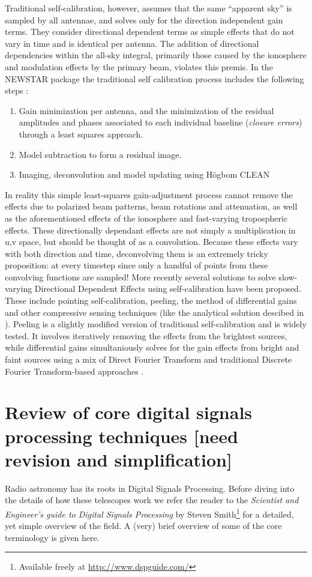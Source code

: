 \documentclass[a4paper,10pt]{report}
\begin{document}
 Traditional self-calibration, however, assumes that the same ``apparent sky'' is sampled by all antennae, and solves only for the direction independent gain terms. They consider directional dependent terms as simple effects that 
 do not vary in time and is identical per antenna. The addition of directional dependencies within the all-sky integral, primarily those caused by the ionosphere and modulation effects by the primary beam, violates this premis. In 
 the NEWSTAR package the traditional self calibration process includes the following steps \cite{2011A&A...527A.107S}:
 \begin{enumerate}
  \item Gain minimization per antenna, and the minimization of the residual amplitudes and phases associated to each individual baseline (\textit{closure errors}) through a least squares approach.
  \item Model subtraction to form a residual image.
  \item Imaging, deconvolution and model updating using H\"ogbom CLEAN
 \end{enumerate}
 
 In reality this simple least-squares gain-adjustment process cannot remove the effects due to polarized beam patterns, beam rotations and attenuation, as well as the aforementioned effects of the ionosphere and fast-varying tropospheric
 effects. These directionally dependant effects are not simply a multiplication in u,v space, but should be thought of as a convolution. Because these effects vary with both direction and time, deconvolving them is an extremely tricky proposition: 
 at every timestep since only a handful of points from these convolving functions are sampled! More recently several solutions to solve slow-varying Directional Dependent Effects using self-calibration have been proposed. These include pointing self-calibration,
 peeling, the method of differential gains and other compressive sensing techniques (like the analytical solution descibed in \cite{hardy2013direct}). Peeling is a slightly modified version of traditional self-calibration and is widely tested. It involves iteratively removing the effects from the brightest sources, while 
 differential gains simultaniously solves for the gain effects from bright and faint sources using a mix of Direct Fourier Transform and traditional Discrete Fourier Transform-based approaches \cite{2011A&A...527A.107S,2011A&A...527A.108S}.
 \section{Review of core digital signals processing techniques [need revision and simplification]}
Radio astronomy has its roots in Digital Signals Processing. Before diving into the details of how these telescopes work we refer the reader to the \textit{Scientist and Engineer's guide to Digital Signals Processing} by 
Steven Smith\footnote{Available freely at \url{http://www.dspguide.com/}}\cite{smith1997scientist} for a detailed, yet simple overview of the field. A (very) brief overview of some of the core terminology is given here.
\end{document}
